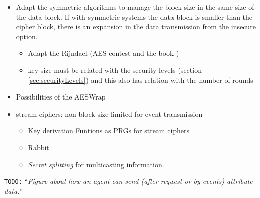 \documentclass[10pt,a4paper,twoside]{llncs}
\newcommand{\todo}[1]{\texttt{\color{red}TODO:} ``\emph{#1}''}
\begin{document}
    \begin{itemize}
        \item Adapt the symmetric algorithms to manage the block size in the same size of the data block. If with symmetric systems the data block is smaller than the cipher block, there is an expansion in the data transmission from the insecure option.
        \begin{itemize}
            \item Adapt the Rijndael \cite{gRijndael} (AES contest \cite{AES-FIPS} and the book \cite{Daemen:2002:DR:560131})
            \item key size must be related with the security levels (section \ref{sec:securityLevels}) and this also has relation with the number of rounds
        \end{itemize}
        \item Possibilities of the AESWrap \cite{rfc3394}
        \item stream ciphers: non block size limited for event transmission
        \begin{itemize}
            \item Key derivation Funtions as PRGs for stream ciphers
            \item Rabbit \cite{rfc4503}
            \item \emph{Secret splitting} for multicasting information.
        \end{itemize}
    \end{itemize}

\todo{Figure about how an agent can send (after request or by events) attribute data.}
    
\end{document}
